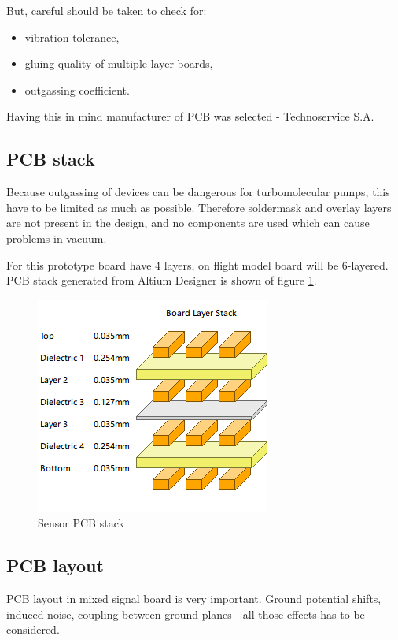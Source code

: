         But, careful should be taken to check for:
        \begin{itemize}
            \item vibration tolerance,
            \item gluing quality of multiple layer boards,
            \item outgassing coefficient.
        \end{itemize}

        Having this in mind manufacturer of PCB was selected - Technoservice S.A.

    \subsection{PCB stack}
        Because outgassing of devices can be dangerous for turbomolecular pumps, this have to be limited as much as possible. Therefore soldermask and overlay layers are not present in the design, and no components are used which can cause problems in vacuum.

        For this prototype board have 4 layers, on flight model board will be 6-layered. PCB stack generated from Altium Designer is shown of figure \ref{PCB_Altium_stack}.

        \begin{figure}[H]
            \centering
            \includegraphics[width=0.3\paperwidth]{img/06/stack.png}
            \caption{Sensor PCB stack}
            \label{PCB_Altium_stack}
        \end{figure}

    \subsection{PCB layout}
        PCB layout in mixed signal board is very important. Ground potential shifts, induced noise, coupling between ground planes - all those effects has to be considered.

